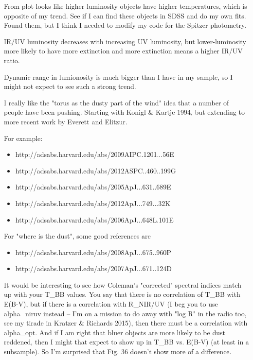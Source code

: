 From plot looks like higher luminosity objects have higher temperatures, which is opposite of my trend. 
See if I can find these objects in SDSS and do my own fits. 
Found them, but I think I needed to modify my code for the Spitzer photometry. 

IR/UV luminosity decreases with increasing UV luminosity, but lower-luminosity more likely to have more extinction and more extinction means a higher IR/UV ratio. 

Dynamic range in lumionosity is much bigger than I have in my sample, so I might not expect to see such a strong trend. 

I really like the "torus as the dusty part of the wind" idea that a number of people have been pushing. 
Starting with Konigl \& Kartje 1994, but extending to more recent work by Everett and Elitzur.

For example:

\begin{itemize}
\item http://adsabs.harvard.edu/abs/2009AIPC.1201...56E
\item http://adsabs.harvard.edu/abs/2012ASPC..460..199G
\item http://adsabs.harvard.edu/abs/2005ApJ...631..689E
\item http://adsabs.harvard.edu/abs/2012ApJ...749...32K
\item http://adsabs.harvard.edu/abs/2006ApJ...648L.101E
\end{itemize}

For "where is the dust", some good references are

\begin{itemize}
\item http://adsabs.harvard.edu/abs/2008ApJ...675..960P
\item http://adsabs.harvard.edu/abs/2007ApJ...671..124D
\end{itemize}

It would be interesting to see how Coleman's "corrected" spectral indices match up with your T\_BB values.
You say that there is no correlation of T\_BB with E(B-V), but if there is a correlation with R\_NIR/UV (I beg you to use alpha\_niruv instead -- I'm on a mission to do away with "log R" in the radio too, see my tirade in Kratzer \& Richards 2015), then there must be a correlation with alpha\_opt.  
And if I am right that bluer objects are more likely to be dust reddened, then I might that expect to show up in T\_BB vs. E(B-V) (at least in a subsample).  
So I'm surprised that Fig. 36 doesn't show more of a difference.

